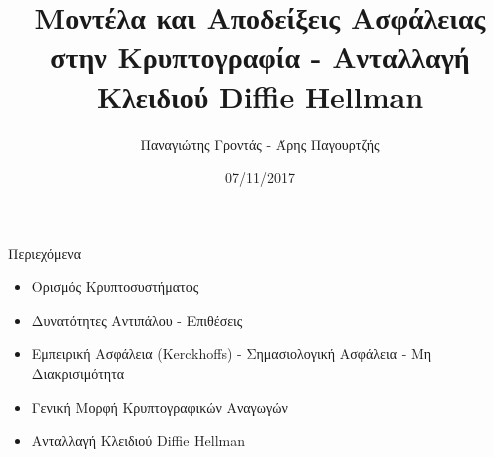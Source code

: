 \documentclass[handout]{beamer}
\title{Μοντέλα και Αποδείξεις Ασφάλειας στην Κρυπτογραφία - Ανταλλαγή Κλειδιού Diffie Hellman}
\author{Παναγιώτης Γροντάς - Άρης Παγουρτζής}
\date{07/11/2017}
\institute{ΕΜΠ - Κρυπτογραφία (2017-2018)}
\begin{document}
\newcommand{\MSG}{ \mathtt{M} }
\newcommand{\KEY}{ \mathtt{K} }
\newcommand{\CPH}{ \mathtt{C} }
\newcommand{\keygen}{\mathtt{KeyGen}}
\newcommand{\enc}{\mathtt{Encrypt}}
\newcommand{\dec}{\mathtt{Decrypt}}
\newcommand{\adv}{$\mathcal{A} \,$ }
\newcommand{\advb}{$\mathcal{B} \,$ }
\newcommand{\chal}{$\mathcal{C} \,$ }
\newcommand{\cs}{$\mathcal{CS} \,$ }

\newcommand{\green}[1]{\textcolor{teal}{#1}}
\newcommand{\Green}[1]{\textcolor{Teal}{#1}}
\newcommand{\ForestGreen}[1]{\textcolor{ForestGreen}{#1}}
\newcommand{\blue}[1]{\textcolor{blue}{#1}}
\newcommand{\magenta}[1]{\textcolor{magenta}{#1}}
\newcommand{\cyan}[1]{\textcolor{cyan}{#1}}

\newcommand{\twopartdef}[4]
{ 
		\begin{cases}
			#1 , #2 \\
			#3 , #4
		\end{cases} 
}
\begin{frame}
\titlepage
\end{frame}



\begin{frame}{Περιεχόμενα}
\begin{itemize}
\item Ορισμός Κρυπτοσυστήματος
\item Δυνατότητες Αντιπάλου - Επιθέσεις
\item Εμπειρική Ασφάλεια (Kerckhoffs) - Σημασιολογική Ασφάλεια - Μη Διακρισιμότητα
\item Γενική Μορφή Κρυπτογραφικών Αναγωγών
\item Ανταλλαγή Κλειδιού Diffie Hellman
\end{itemize}
\end{frame}
\end{document}
